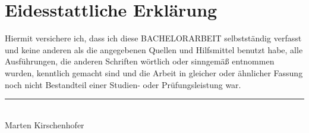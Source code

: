 \chapter*{Eidesstattliche Erklärung}
\label{sec:affidavit}
Hiermit versichere ich, dass ich diese BACHELORARBEIT selbstständig
verfasst und keine anderen als die angegebenen Quellen und Hilfsmittel
benutzt habe, alle Ausführungen, die anderen Schriften wörtlich oder
sinngemäß entnommen wurden, kenntlich gemacht sind und die Arbeit in
gleicher oder ähnlicher Fassung noch nicht Bestandteil einer Studien-
oder Prüfungsleistung war.

\vspace{20mm}

\noindent
\rule[-0.2cm]{5cm}{0.5pt}\\
Marten Kirschenhofer
